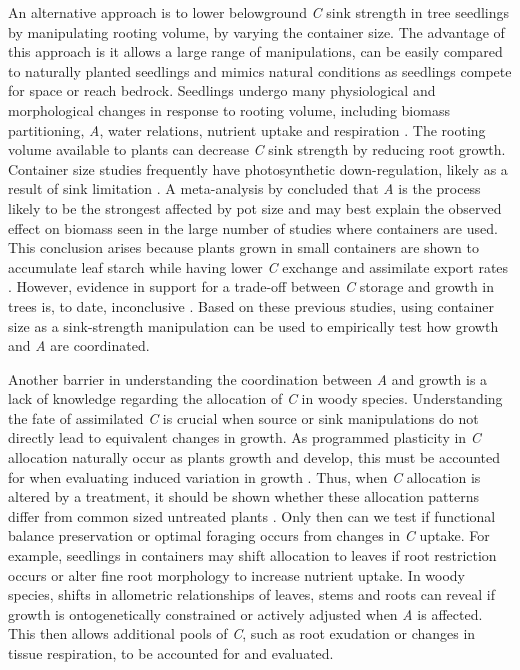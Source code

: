 \documentclass[a4paper]{article}\usepackage[]{graphicx}\usepackage[]{color}
\begin{document}
An alternative approach is to lower belowground \textit{C} sink strength in tree seedlings by manipulating rooting volume, by varying the container size. The advantage of this approach is it allows a large range of manipulations, can be easily compared to naturally planted seedlings and mimics natural conditions as seedlings compete for space or reach bedrock. Seedlings undergo many physiological and morphological changes in response to rooting volume, including biomass partitioning, \textit{A}, water relations, nutrient uptake and respiration \citep[and references therein]{nesmith1998effect}. The rooting volume available to plants can decrease \textit{C} sink strength by reducing root growth. Container size studies frequently have photosynthetic down-regulation, likely as a result of sink limitation \citep{arp1991effects, mcconnaughay1991physical, gunderson1994photosynthetic, sage1994acclimation, maina2002intra, ronchi2006growth}. A meta-analysis by \citet{poorter2012pot} concluded that \textit{A} is the process likely to be the strongest affected by pot size and may best explain the observed effect on biomass seen in the large number of studies where containers are used. This conclusion arises because plants grown in small containers are shown to accumulate leaf starch while having lower \textit{C} exchange and assimilate export rates \citep{robbins1988effect}. However, evidence in support for a trade-off between \textit{C} storage and growth in trees is, to date, inconclusive \citep{palacio2014does}. Based on these previous studies, using container size as a sink-strength manipulation can be used to empirically test how growth and \textit{A} are coordinated.

Another barrier in understanding the coordination between \textit{A} and growth is a lack of knowledge regarding the allocation of \textit{C} in woody species.  Understanding the fate of assimilated \textit{C} is crucial when source or sink manipulations do not directly lead to equivalent changes in growth. As programmed plasticity in \textit{C} allocation naturally occur as plants growth and develop, this must be accounted for when evaluating induced variation in growth \citep{wright2002interpreting}. Thus, when \textit{C} allocation is altered by a treatment, it should be shown whether these allocation patterns differ from common sized untreated plants \citep{reich2002root, poorter2012biomass}. Only then can we test if functional balance preservation or optimal foraging occurs from changes in \textit{C} uptake. For example, seedlings in containers may shift allocation to leaves if root restriction occurs or alter fine root morphology to increase nutrient uptake. In woody species, shifts in allometric relationships of leaves, stems and roots can reveal if growth is ontogenetically constrained or actively adjusted when \textit{A} is affected. This then allows additional pools of \textit{C}, such as root exudation or changes in tissue respiration, to be accounted for and evaluated.
\end{document}
